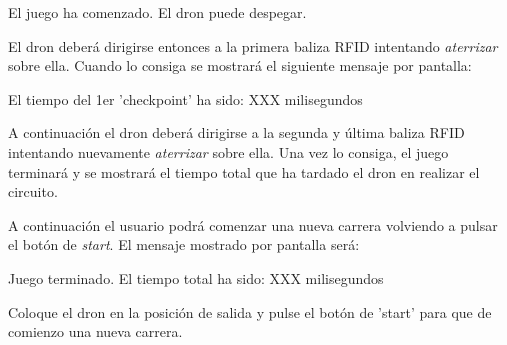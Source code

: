     \begin{description}
    		\item \hspace{10mm} El juego ha comenzado. El dron puede despegar.
	\end{description}

El dron deberá dirigirse entonces a la primera baliza RFID intentando \textit{aterrizar} sobre ella.  Cuando lo consiga se mostrará el siguiente mensaje por pantalla:
    \begin{description}
    		\item \hspace{10mm} El tiempo del 1er 'checkpoint' ha sido: XXX milisegundos
	\end{description}
	
A continuación el dron deberá dirigirse a la segunda y última baliza RFID intentando nuevamente \textit{aterrizar} sobre ella.  Una vez lo consiga, el juego terminará y se mostrará el tiempo total que ha tardado el dron en realizar el circuito. 

A continuación el usuario podrá comenzar una nueva carrera volviendo a pulsar el botón de \textit{start}. El mensaje mostrado por pantalla será:

    \begin{description}
    		\item \hspace{10mm} Juego terminado. El tiempo total ha sido: XXX milisegundos
    		\item \hspace{10mm} Coloque el dron en la posición de salida y pulse el botón de 'start' para que de comienzo una nueva carrera.
	\end{description}	
